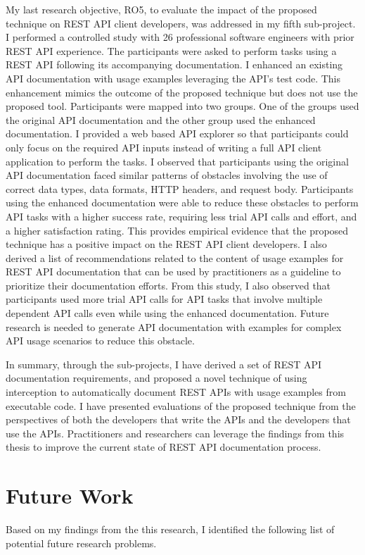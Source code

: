 \documentclass[12pt]{ucalgthes1}
\begin{document}
My last research objective, RO5, to evaluate the impact of the proposed technique on REST API client developers, was addressed in my fifth sub-project. I performed a controlled study with 26 professional software engineers with prior REST API experience. The participants were asked to perform tasks using a REST API following its accompanying documentation. I enhanced an existing API documentation with usage examples leveraging the API's test code. This enhancement mimics the outcome of the proposed technique but does not use the proposed tool. Participants were mapped into two groups. One of the groups used the original API documentation and the other group used the enhanced documentation. I provided a web based API explorer so that participants could only focus on the required API inputs instead of writing a full API client application to perform the tasks. I observed that participants using the original API documentation faced similar patterns of obstacles involving the use of correct data types, data formats, HTTP headers, and request body. Participants using the enhanced documentation were able to reduce these obstacles to perform API tasks with a higher success rate, requiring less trial API calls and effort, and a higher satisfaction rating. This provides empirical evidence that the proposed technique has a positive impact on the REST API client developers. I also derived a list of recommendations related to the content of usage examples for REST API documentation that can be used by practitioners as a guideline to prioritize their documentation efforts. From this study, I also observed that participants used more trial API calls for API tasks that involve multiple dependent API calls even while using the enhanced documentation. Future research is needed to generate API documentation with examples for complex API usage scenarios to reduce this obstacle.

In summary, through the sub-projects, I have derived a set of REST API documentation requirements, and proposed a novel technique of using interception to automatically document REST APIs with usage examples from executable code. I have presented evaluations of the proposed technique from the perspectives of both the developers that write the APIs and the developers that use the APIs. Practitioners and researchers can leverage the findings from this thesis to improve the current state of REST API documentation process.

\section{Future Work}
Based on my findings from the this research, I identified the following list of potential future research problems.
\end{document}
